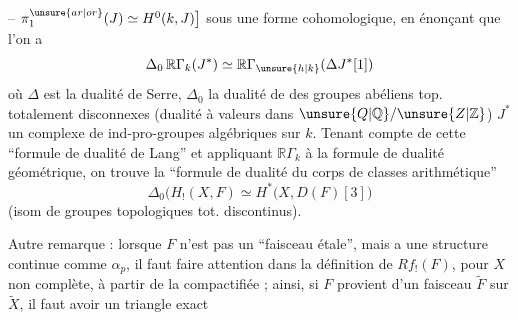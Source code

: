  -- $\pi_1^{\unsure{ar|or}}(J)\simeq H^0(k,J)\bigr]$ sous une forme cohomologique, en énonçant que l'on a
\[
\Delta_0\,\mathbb{R}\Gamma_k(J^*)\simeq\mathbb{R}\Gamma_{\unsure{h|k}}(\Delta J^*[1])
\]
où $\Delta$ est la dualité de Serre, $\Delta_0$ la dualité de  des groupes abéliens top. totalement disconnexes (dualité à valeurs dans $\unsure{Q|\mathbb Q}/\unsure{Z|\mathbb Z}$) $J^*$ un complexe de ind-pro-groupes algébriques sur $k$. Tenant compte de cette ``formule de dualité de Lang'' et appliquant $\mathbb{R}\Gamma_k$ à la formule de dualité  géométrique, on trouve la ``formule de dualité du corps de classes arithmétique''
\[
\boxed{\Delta_0\bigl(H_!(X,F)\simeq H^*\bigl(X,D(F)[3]\bigr)}
\]
(isom de groupes topologiques tot. discontinus).

Autre remarque : lorsque $F$ n'est pas un ``faisceau étale'', mais a une structure continue comme $\alpha_p$, il faut faire attention dans la définition de $Rf_!(F)$, pour $X$ non complète, à partir de la compactifiée  ; ainsi, si $F$ provient d'un faisceau  $\widetilde F$ sur $\widetilde X$, il faut avoir un triangle exact
